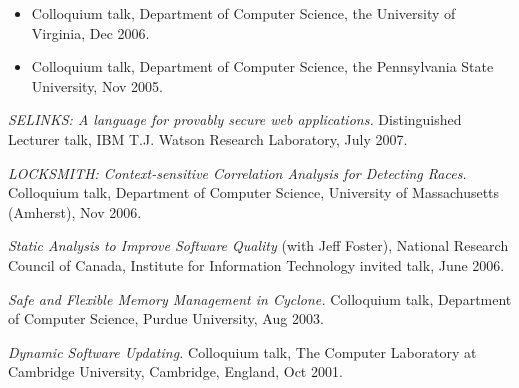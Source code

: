 \documentclass[11pt]{article}
\begin{document}
\begin{description}
\begin{itemize}
            \item
                Colloquium talk, Department of Computer Science, the University of Virginia, Dec 2006. 
            \item
                Colloquium talk, Department of Computer Science, the Pennsylvania State University, Nov 2005. 
        \end{itemize}
    \item
        \textit{SELINKS: A language for provably secure web applications.} Distinguished Lecturer talk, IBM T.J. Watson Research Laboratory, July 2007. 
    \item
        \textit{LOCKSMITH: Context-sensitive Correlation Analysis for Detecting Races.} Colloquium talk, Department of Computer Science, University of Massachusetts (Amherst), Nov 2006. 
    \item
        \textit{Static Analysis to Improve Software Quality} (with Jeff Foster), National Research Council of Canada, Institute for Information Technology invited talk, June 2006. 
    \item
        \textit{Safe and Flexible Memory Management in Cyclone.} Colloquium talk, Department of Computer Science, Purdue University, Aug 2003. 
    \item
        \textit{Dynamic Software Updating.} Colloquium talk, The Computer Laboratory at Cambridge University, Cambridge, England, Oct 2001. 

        \end{description}

        
\end{document}
